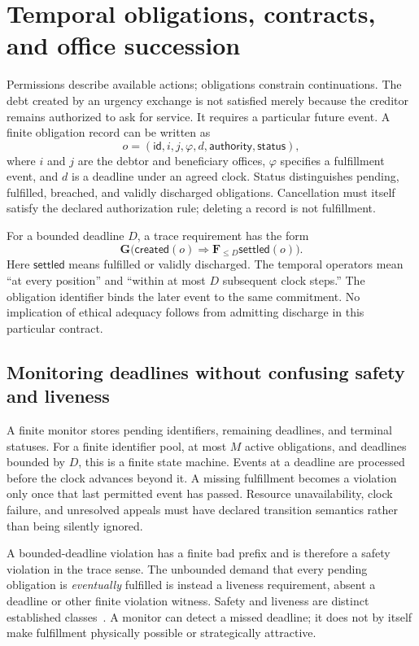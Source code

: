 \documentclass[11pt,letterpaper]{article}
\theoremstyle{plain}
\theoremstyle{definition}
\theoremstyle{remark}
\begin{document}
\section{Temporal obligations, contracts, and office succession}\label{sec:obligations}
Permissions describe available actions; obligations constrain continuations. The debt created by an urgency exchange is not satisfied merely because the creditor remains authorized to ask for service. It requires a particular future event. A finite obligation record can be written as
\[
o=(\mathsf{id},i,j,\varphi,d,\mathsf{authority},\mathsf{status}),
\]
where $i$ and $j$ are the debtor and beneficiary offices, $\varphi$ specifies a fulfillment event, and $d$ is a deadline under an agreed clock. Status distinguishes pending, fulfilled, breached, and validly discharged obligations. Cancellation must itself satisfy the declared authorization rule; deleting a record is not fulfillment.

For a bounded deadline $D$, a trace requirement has the form
\[
\mathbf G\bigl(\mathsf{created}(o)\Rightarrow
\mathbf F_{\leq D}\mathsf{settled}(o)\bigr).
\]
Here $\mathsf{settled}$ means fulfilled or validly discharged. The temporal operators mean ``at every position'' and ``within at most $D$ subsequent clock steps.'' The obligation identifier binds the later event to the same commitment. No implication of ethical adequacy follows from admitting discharge in this particular contract.

\subsection{Monitoring deadlines without confusing safety and liveness}
A finite monitor stores pending identifiers, remaining deadlines, and terminal statuses. For a finite identifier pool, at most $M$ active obligations, and deadlines bounded by $D$, this is a finite state machine. Events at a deadline are processed before the clock advances beyond it. A missing fulfillment becomes a violation only once that last permitted event has passed. Resource unavailability, clock failure, and unresolved appeals must have declared transition semantics rather than being silently ignored.

A bounded-deadline violation has a finite bad prefix and is therefore a safety violation in the trace sense. The unbounded demand that every pending obligation is \emph{eventually} fulfilled is instead a liveness requirement, absent a deadline or other finite violation witness. Safety and liveness are distinct established classes~\cite{alpern}. A monitor can detect a missed deadline; it does not by itself make fulfillment physically possible or strategically attractive.
\end{document}
